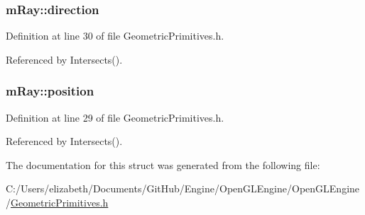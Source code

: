 \subsubsection[{\texorpdfstring{direction}{direction}}]{ m\+Ray\+::direction}\hypertarget{structm_ray_ad73b22665f6e491662e6699271a2a501}{}\label{structm_ray_ad73b22665f6e491662e6699271a2a501}


Definition at line 30 of file Geometric\+Primitives.\+h.



Referenced by Intersects().

\subsubsection[{\texorpdfstring{position}{position}}]{ m\+Ray\+::position}\hypertarget{structm_ray_a3a3743f095755755300b5a0431fb8ae4}{}\label{structm_ray_a3a3743f095755755300b5a0431fb8ae4}


Definition at line 29 of file Geometric\+Primitives.\+h.



Referenced by Intersects().



The documentation for this struct was generated from the following file\+:\begin{DoxyCompactItemize}
\item 
C\+:/\+Users/elizabeth/\+Documents/\+Git\+Hub/\+Engine/\+Open\+G\+L\+Engine/\+Open\+G\+L\+Engine/\hyperlink{_geometric_primitives_8h}{Geometric\+Primitives.\+h}\end{DoxyCompactItemize}
